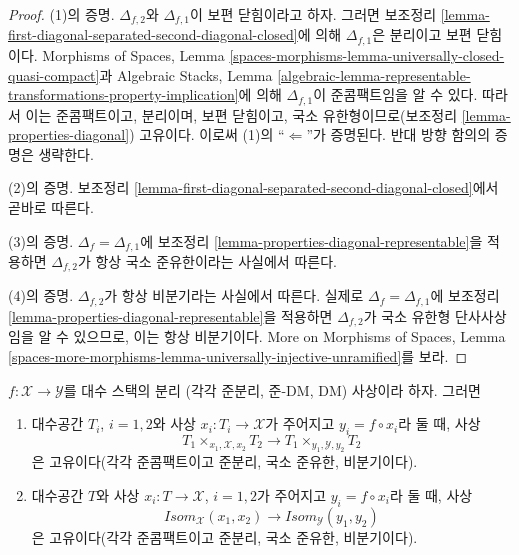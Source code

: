 \begin{proof}
(1)의 증명. $\Delta_{f, 2}$와 $\Delta_{f, 1}$이 보편 닫힘이라고 하자.
그러면 보조정리
\ref{lemma-first-diagonal-separated-second-diagonal-closed}에 의해
$\Delta_{f, 1}$은 분리이고 보편 닫힘이다. Morphisms of Spaces, Lemma
\ref{spaces-morphisms-lemma-universally-closed-quasi-compact}과
Algebraic Stacks, Lemma
\ref{algebraic-lemma-representable-transformations-property-implication}에 의해
$\Delta_{f, 1}$이 준콤팩트임을 알 수 있다. 따라서 이는 준콤팩트이고,
분리이며, 보편 닫힘이고, 국소 유한형이므로(보조정리
\ref{lemma-properties-diagonal}) 고유이다. 이로써 (1)의
``$\Leftarrow$''가 증명된다. 반대 방향 함의의 증명은 생략한다.

\medskip\noindent
(2)의 증명. 보조정리
\ref{lemma-first-diagonal-separated-second-diagonal-closed}에서 곧바로 따른다.

\medskip\noindent
(3)의 증명. $\Delta_f = \Delta_{f, 1}$에 보조정리
\ref{lemma-properties-diagonal-representable}을 적용하면
$\Delta_{f, 2}$가 항상 국소 준유한이라는 사실에서 따른다.

\medskip\noindent
(4)의 증명. $\Delta_{f, 2}$가 항상 비분기라는 사실에서 따른다.
실제로 $\Delta_f = \Delta_{f, 1}$에 보조정리
\ref{lemma-properties-diagonal-representable}을 적용하면
$\Delta_{f, 2}$가 국소 유한형 단사사상임을 알 수 있으므로, 이는 항상
비분기이다. More on Morphisms of Spaces, Lemma
\ref{spaces-more-morphisms-lemma-universally-injective-unramified}를 보라.
\end{proof}

\begin{lemma}
\label{lemma-separated-implies-isom}
$f : \mathcal{X} \to \mathcal{Y}$를 대수 스택의 분리
(각각 준분리, 준-DM, DM) 사상이라 하자. 그러면
\begin{enumerate}
\item 대수공간 $T_i$, $i = 1, 2$와 사상
$x_i : T_i \to \mathcal{X}$가 주어지고 $y_i = f \circ x_i$라 둘 때, 사상
$$
T_1 \times_{x_1, \mathcal{X}, x_2} T_2 \longrightarrow
T_1 \times_{y_1, \mathcal{Y}, y_2} T_2
$$
은 고유이다(각각 준콤팩트이고 준분리, 국소 준유한, 비분기이다).
\item 대수공간 $T$와 사상
$x_i : T \to \mathcal{X}$, $i = 1, 2$가 주어지고
$y_i = f \circ x_i$라 둘 때, 사상
$$
\mathit{Isom}_\mathcal{X}(x_1, x_2) \longrightarrow
\mathit{Isom}_\mathcal{Y}(y_1, y_2)
$$
은 고유이다(각각 준콤팩트이고 준분리, 국소 준유한, 비분기이다).
\end{enumerate}
\end{lemma}

